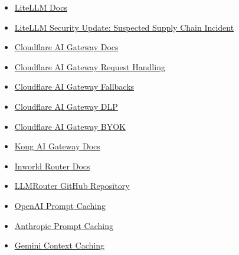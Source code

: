 \documentclass[10pt,a4paper]{ctexart}
\begin{document}
\begin{itemize}[itemsep=2pt, topsep=4pt]
  \item \href{https://docs.litellm.ai/docs/}{LiteLLM Docs}
  \item \href{https://docs.litellm.ai/blog/security-update-march-2026}{LiteLLM Security Update: Suspected Supply Chain Incident}
  \item \href{https://developers.cloudflare.com/ai-gateway/}{Cloudflare AI Gateway Docs}
  \item \href{https://developers.cloudflare.com/ai-gateway/configuration/request-handling/}{Cloudflare AI Gateway Request Handling}
  \item \href{https://developers.cloudflare.com/ai-gateway/configuration/fallbacks/}{Cloudflare AI Gateway Fallbacks}
  \item \href{https://developers.cloudflare.com/ai-gateway/features/dlp/set-up-dlp/}{Cloudflare AI Gateway DLP}
  \item \href{https://developers.cloudflare.com/ai-gateway/configuration/bring-your-own-keys/}{Cloudflare AI Gateway BYOK}
  \item \href{https://developer.konghq.com/ai-gateway/}{Kong AI Gateway Docs}
  \item \href{https://docs.inworld.ai/router/introduction}{Inworld Router Docs}
  \item \href{https://github.com/ulab-uiuc/LLMRouter}{LLMRouter GitHub Repository}
  \item \href{https://platform.openai.com/docs/guides/prompt-caching}{OpenAI Prompt Caching}
  \item \href{https://docs.anthropic.com/en/docs/build-with-claude/prompt-caching}{Anthropic Prompt Caching}
  \item \href{https://ai.google.dev/gemini-api/docs/caching}{Gemini Context Caching}
\end{itemize}
\end{document}
